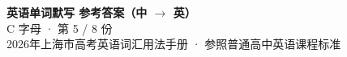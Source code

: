 \documentclass[10pt,a4paper]{article}
\begin{document}
\pagestyle{plain}

\begin{center}
{\LARGE\bfseries 英语单词默写 \quad 参考答案（中 $\to$ 英）}\\[0.22em]
{\large C 字母 · 第 5 / 8 份}\\[0.18em]
{\small 2026年上海市高考英语词汇用法手册 · 参照普通高中英语课程标准}
\end{center}

\vspace{0.2em}
\noindent{\color{rulegray}\rule{\textwidth}{0.8pt}}

\vspace{0.35em}

\vspace{0.25em}
\renewcommand{\arraystretch}{1.32}
\end{document}
